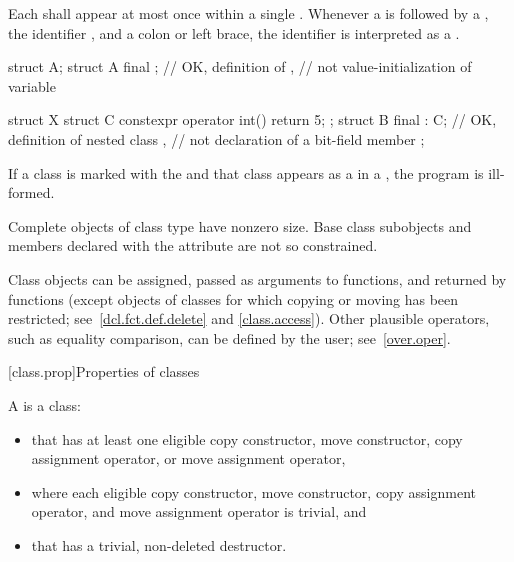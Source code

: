 \pnum
Each  shall appear at most once
within a single .
Whenever a  is followed
by a ,
the identifier , and a colon or left brace,
the identifier is interpreted as a .
\begin{example}
\begin{codeblock}
struct A;
struct A final {};      // OK, definition of ,
                        // not value-initialization of variable 

struct X {
 struct C { constexpr operator int() { return 5; } };
 struct B final : C{};  // OK, definition of nested class ,
                        // not declaration of a bit-field member 
};
\end{codeblock}
\end{example}

\pnum
If a class is marked with the 
 and that class appears as a 
in a , the program is ill-formed.

\pnum
\begin{note}
Complete objects of class type have nonzero size.
Base class subobjects and
members declared with the  attribute
are not so constrained.
\end{note}

\pnum
\begin{note}
Class objects can be assigned,
passed as arguments to functions, and
returned by functions (except objects of classes for which copying or moving has
been restricted; see~\ref{dcl.fct.def.delete} and \ref{class.access}).
Other plausible operators, such as equality comparison,
can be defined by the user; see~\ref{over.oper}.
\end{note}

[class.prop]{Properties of classes}

\pnum
A  is a class:
\begin{itemize}
\item that has at least one eligible
copy constructor, move constructor,
copy assignment operator, or
move assignment operator,
\item where each eligible copy constructor, move constructor, copy assignment operator,
and move assignment operator is trivial, and
\item that has a trivial, non-deleted destructor.
\end{itemize}

